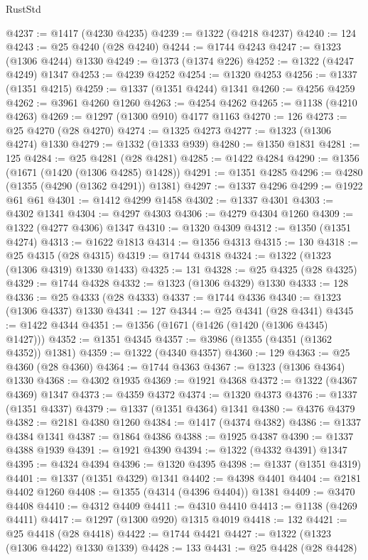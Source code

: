 \begin{lexlean}{RustStd}
\begin{coremodule}
@4237 := @1417 (@4230 @4235)
@4239 := @1322 (@4218 @4237)
@4240 := 124
@4243 := @25 @4240 (@28 @4240)
@4244 := @1744 @4243
@4247 := @1323 (@1306 @4244) @1330
@4249 := @1373 (@1374 @226)
@4252 := @1322 (@4247 @4249) @1347
@4253 := @4239 @4252
@4254 := @1320 @4253
@4256 := @1337 (@1351 @4215)
@4259 := @1337 (@1351 @4244) @1341
@4260 := @4256 @4259
@4262 := @3961 @4260 @1260
@4263 := @4254 @4262
@4265 := @1138 (@4210 @4263)
@4269 := @1297 (@1300 @910) @4177 @1163
@4270 := 126
@4273 := @25 @4270 (@28 @4270)
@4274 := @1325 @4273
@4277 := @1323 (@1306 @4274) @1330
@4279 := @1332 (@1333 @939)
@4280 := @1350 @1831
@4281 := 125
@4284 := @25 @4281 (@28 @4281)
@4285 := @1422 @4284
@4290 := @1356 (@1671 (@1420 (@1306 @4285) @1428))
@4291 := @1351 @4285
@4296 := @4280 (@1355 (@4290 (@1362 @4291)) @1381)
@4297 := @1337 @4296
@4299 := @1922 @61 @61
@4301 := @1412 @4299 @1458
@4302 := @1337 @4301
@4303 := @4302 @1341
@4304 := @4297 @4303
@4306 := @4279 @4304 @1260
@4309 := @1322 (@4277 @4306) @1347
@4310 := @1320 @4309
@4312 := @1350 (@1351 @4274)
@4313 := @1622 @1813
@4314 := @1356 @4313
@4315 := 130
@4318 := @25 @4315 (@28 @4315)
@4319 := @1744 @4318
@4324 := @1322 (@1323 (@1306 @4319) @1330 @1433)
@4325 := 131
@4328 := @25 @4325 (@28 @4325)
@4329 := @1744 @4328
@4332 := @1323 (@1306 @4329) @1330
@4333 := 128
@4336 := @25 @4333 (@28 @4333)
@4337 := @1744 @4336
@4340 := @1323 (@1306 @4337) @1330
@4341 := 127
@4344 := @25 @4341 (@28 @4341)
@4345 := @1422 @4344
@4351 := @1356 (@1671 (@1426 (@1420 (@1306 @4345) @1427)))
@4352 := @1351 @4345
@4357 := @3986 (@1355 (@4351 (@1362 @4352)) @1381)
@4359 := @1322 (@4340 @4357)
@4360 := 129
@4363 := @25 @4360 (@28 @4360)
@4364 := @1744 @4363
@4367 := @1323 (@1306 @4364) @1330
@4368 := @4302 @1935
@4369 := @1921 @4368
@4372 := @1322 (@4367 @4369) @1347
@4373 := @4359 @4372
@4374 := @1320 @4373
@4376 := @1337 (@1351 @4337)
@4379 := @1337 (@1351 @4364) @1341
@4380 := @4376 @4379
@4382 := @2181 @4380 @1260
@4384 := @1417 (@4374 @4382)
@4386 := @1337 @4384 @1341
@4387 := @1864 @4386
@4388 := @1925 @4387
@4390 := @1337 @4388 @1939
@4391 := @1921 @4390
@4394 := @1322 (@4332 @4391) @1347
@4395 := @4324 @4394
@4396 := @1320 @4395
@4398 := @1337 (@1351 @4319)
@4401 := @1337 (@1351 @4329) @1341
@4402 := @4398 @4401
@4404 := @2181 @4402 @1260
@4408 := @1355 (@4314 (@4396 @4404)) @1381
@4409 := @3470 @4408
@4410 := @4312 @4409
@4411 := @4310 @4410
@4413 := @1138 (@4269 @4411)
@4417 := @1297 (@1300 @920) @1315 @4019
@4418 := 132
@4421 := @25 @4418 (@28 @4418)
@4422 := @1744 @4421
@4427 := @1322 (@1323 (@1306 @4422) @1330 @1339)
@4428 := 133
@4431 := @25 @4428 (@28 @4428)

\end{coremodule}
\end{lexlean}
